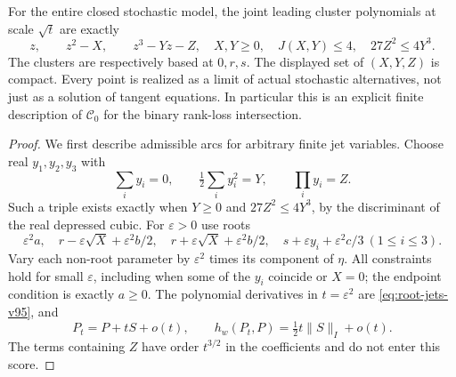 \begin{theorem}\label{thm:cubic-fibre-v95}
For the entire closed stochastic model, the joint leading cluster
polynomials at scale $\sqrt t$ are exactly
\begin{equation}\label{eq:explicit-fibre-v95}
 z,\qquad z^2-X,\qquad z^3-Yz-Z,
 \quad X,Y\ge0,\quad J(X,Y)\le4,\quad 27Z^2\le4Y^3.
\end{equation}
The clusters are respectively based at $0,r,s$. The displayed set of
$(X,Y,Z)$ is compact. Every point is realized as a limit of actual
stochastic alternatives, not just as a solution of tangent equations.
In particular this is an explicit finite description of $\mathscr C_0$
for the binary rank-loss intersection.
\end{theorem}
\begin{proof}
We first describe admissible arcs for arbitrary finite jet variables.
Choose real $y_1,y_2,y_3$ with
\begin{equation}\label{eq:triple-shape-v95}
 \sum_i y_i=0,\qquad \tfrac12\sum_i y_i^2=Y,\qquad
 \prod_i y_i=Z.
\end{equation}
Such a triple exists exactly when $Y\ge0$ and $27Z^2\le4Y^3$, by
the discriminant of the real depressed cubic. For $\varepsilon>0$ use
roots
\begin{equation}\label{eq:realizing-arcs-v95}
 \varepsilon^2a,\quad
 r-\varepsilon\sqrt X+\varepsilon^2b/2,\quad
 r+\varepsilon\sqrt X+\varepsilon^2b/2,\quad
 s+\varepsilon y_i+\varepsilon^2c/3\ (1\le i\le3).
\end{equation}
Vary each non-root parameter by $\varepsilon^2$ times its component
of $\eta$. All constraints hold for small $\varepsilon$, including
when some of the $y_i$ coincide or $X=0$; the endpoint condition is
exactly $a\ge0$. The polynomial derivatives in $t=\varepsilon^2$ are
\eqref{eq:root-jets-v95}, and
\begin{equation}\label{eq:fisher-expansion-v95}
 P_t=P+tS+o(t),\qquad h_w(P_t,P)=\tfrac12t\|S\|_I+o(t).
\end{equation}
The terms containing $Z$ have order $t^{3/2}$ in the coefficients and
do not enter this score.


\end{proof}

